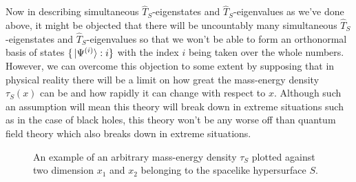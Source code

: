 Now in describing simultaneous $\hat{T}_S$-eigenstates and  $\hat{T}_S$-eigenvalues as we've done above, it might be objected that there will be uncountably many simultaneous $\hat{T}_S$-eigenstates and  $\hat{T}_S$-eigenvalues so that we won't be able to form an orthonormal basis of states $\{\ket*{\Psi^{(i)}}:i\}$ with the index $i$ being taken over the whole numbers. However, we can overcome this objection to some extent by supposing that in physical reality there will be a limit on how great the mass-energy density $\tau_S(x)$ can be and how rapidly it can change with respect to $x$. Although such an assumption will mean this theory will break down in extreme situations such as in the case of black holes, this theory won't be any worse off than quantum field theory which also breaks down in extreme situations.
\begin{figure}[ht!]
  \captionsetup{justification=justified}
  \centering
  
  \vspace*{2px}
  \caption{An example of an arbitrary mass-energy density $\tau_S$ plotted against two dimension $x_1$ and $x_2$ belonging to the spacelike hypersurface $S$. }\label{tauSexample}
  \end{figure}

